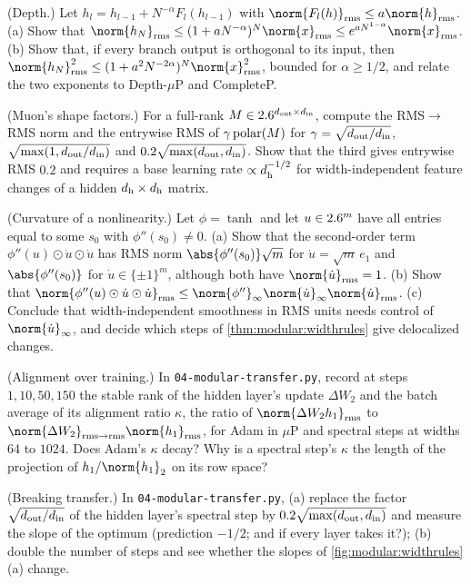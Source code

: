 \begin{refsection}
\begin{exercises}
\item \variation (Depth.) Let $h_l=h_{l-1}+N^{-\alpha}F_l(h_{l-1})$ with $\norm{F_l(h)}_\rms\le a\norm{h}_\rms$. (a) Show that $\norm{h_N}_\rms\le(1+aN^{-\alpha})^N\norm{x}_\rms\le e^{aN^{1-\alpha}}\norm{x}_\rms$. (b) Show that, if every branch output is orthogonal to its input, then $\norm{h_N}^2_\rms\le(1+a^2N^{-2\alpha})^N\norm{x}_\rms^2$, bounded for $\alpha\ge1/2$, and relate the two exponents to Depth-$\mu$P and CompleteP.\label{ex:modular:depth}

\item \variation (Muon's shape factors.) For a full-rank $M\in2.6^{d_{\mathrm{out}}\times d_{\mathrm{in}}}$, compute the RMS$\to$RMS norm and the entrywise RMS of $\gamma\operatorname{polar}(M)$ for $\gamma=\sqrt{d_{\mathrm{out}}/d_{\mathrm{in}}}$, $\sqrt{\max(1,d_{\mathrm{out}}/d_{\mathrm{in}})}$ and $0.2\sqrt{\max(d_{\mathrm{out}},d_{\mathrm{in}})}$. Show that the third gives entrywise RMS $0.2$ and requires a base learning rate $\propto d_{\mathrm h}^{-1/2}$ for width-independent feature changes of a hidden $d_{\mathrm h}\times d_{\mathrm h}$ matrix.\label{ex:modular:muonscale}

\item \variation (Curvature of a nonlinearity.) Let $\phi=\tanh$ and let $u\in2.6^m$ have all entries equal to some $s_0$ with $\phi''(s_0)\ne0$. (a) Show that the second-order term $\phi''(u)\odot\dot u\odot\dot u$ has RMS norm $\abs{\phi''(s_0)}\sqrt m$ for $\dot u=\sqrt m\,e_1$ and $\abs{\phi''(s_0)}$ for $\dot u\in\{\pm1\}^m$, although both have $\norm{\dot u}_\rms=1$. (b) Show that $\norm{\phi''(u)\odot\dot u\odot\dot u}_\rms\le\norm{\phi''}_\infty\norm{\dot u}_\infty\norm{\dot u}_\rms$. (c) Conclude that width-independent smoothness in RMS units needs control of $\norm{\dot u}_\infty$, and decide which steps of \cref{thm:modular:widthrules} give delocalized changes.\label{ex:modular:curvature}

\item \simulation (Alignment over training.) In \texttt{04-modular-\allowbreak transfer.py}, record at steps $1,10,50,150$ the stable rank of the hidden layer's update $\Delta W_2$ and the batch average of its alignment ratio $\kappa$, the ratio of $\norm{\Delta W_2h_1}_\rms$ to $\norm{\Delta W_2}_{\rms\to\rms}\norm{h_1}_\rms$, for Adam in $\mu$P and spectral steps at widths $64$ to $1024$. Does Adam's $\kappa$ decay? Why is a spectral step's $\kappa$ the length of the projection of $h_1/\norm{h_1}_2$ on its row space?\label{ex:modular:align}

\item \simulation (Breaking transfer.) In \texttt{04-modular-transfer.py}, (a) replace the factor $\sqrt{d_{\mathrm{out}}/d_{\mathrm{in}}}$ of the hidden layer's spectral step by $0.2\sqrt{\max(d_{\mathrm{out}},d_{\mathrm{in}})}$ and measure the slope of the optimum (prediction $-1/2$; and if every layer takes it?); (b) double the number of steps and see whether the slopes of \cref{fig:modular:widthrules}(a) change.\label{ex:modular:break}


\end{exercises}
\end{refsection}
